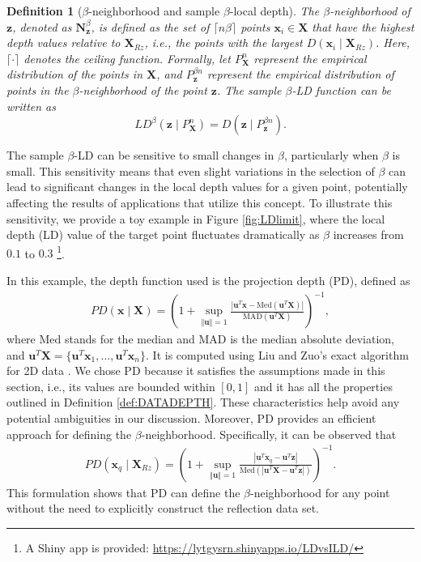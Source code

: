 \documentclass[final,3p,times]{elsarticle}
\newtheorem{thm}{\bf Definition}[section]
\newcommand{\vecx}{\mathbf{x}}
\newcommand{\vecX}{\mathbf{X}}
\newcommand{\vecN}{\mathbf{N}}
\newcommand{\vecz}{\mathbf{z}}
\begin{document}
\begin{thm}[$\beta$-neighborhood and sample $\beta$-local depth] \label{def:betanbr}
The $\beta$-neighborhood of $\vecz$, denoted as $\vecN^\beta_\vecz$, is defined as the set of $\lceil n\beta \rceil$ points $\vecx_i \in \mathbf{X}$ that have the highest depth values relative to $\mathbf{X}_{Rz}$, i.e., the points with the largest $D\left(\vecx_i \mid \mathbf{X}_{Rz}\right)$. Here, $\lceil \cdot \rceil$ denotes the ceiling function.
Formally, let $P^{n}_\vecX$ represent the empirical distribution of the points in $\mathbf{X}$, and $P^{\beta n}_{\vecz}$ represent the empirical distribution of points in the $\beta$-neighborhood of the point $\vecz$. The sample $\beta$-LD function can be written as 
\begin{equation}
  LD^\beta(\vecz \mid P^n_\vecX) =D(\vecz \mid P^{\beta n}_{\vecz}).
\end{equation}

\end{thm}
The sample $\beta$-LD can be sensitive to small changes in $\beta$, particularly when $\beta$ is small. This sensitivity means that even slight variations in the selection of $\beta$ can lead to significant changes in the local depth values for a given point, potentially affecting the results of applications that utilize this concept. To illustrate this sensitivity, we provide a toy example in Figure \ref{fig:LDlimit}, where the local depth (LD) value of the target point fluctuates dramatically as $\beta$ increases from $0.1$ to $0.3$ \footnote{A Shiny app is provided: \url{https://lytgysrn.shinyapps.io/LDvsILD/}}.


In this example, the depth function used is the projection depth (PD), defined as
\begin{eqnarray}\label{eq:pd}
PD(\vecx\mid\mathbf{X})=\left(1+\sup_{\Vert \boldsymbol{u} \Vert=1}\frac{|\boldsymbol{u}^T \vecx-\text{Med}(\boldsymbol{u}^T\mathbf{X})|}{\text{MAD}(\boldsymbol{u}^T\mathbf{X})}\right)^{-1},
\end{eqnarray}
where $\mathrm{Med}$ stands for the median and $\mathrm{MAD}$ is the median absolute deviation, and 
$\boldsymbol{u}^{T}\mathbf{X}=\{\boldsymbol{u}^{T}\vecx_{1},\ldots,\boldsymbol{u}^{T}\vecx_{n}\}.$
It is computed using Liu and Zuo's exact algorithm for 2D data \cite{liu2013exactly,liu2014computing}. We chose PD because it satisfies the assumptions made in this section, i.e., its values are bounded within $[0, 1]$ and it has all the properties outlined in Definition \ref{def:DATADEPTH}. These characteristics help avoid any potential ambiguities in our discussion.
Moreover, PD provides an efficient approach for defining the $\beta$-neighborhood. Specifically, it can be observed that
 \begin{eqnarray}
     PD(\vecx_q\mid \vecX_{Rz})=\left(1+\sup_{\Vert \boldsymbol{u} \Vert=1}\frac{|\boldsymbol{u}^T \vecx_q-\boldsymbol{u}^T \vecz|}{\text{Med}(|\boldsymbol{u}^T\mathbf{X}-\boldsymbol{u}^T \vecz|)}\right)^{-1}.
 \end{eqnarray}
This formulation shows that PD can define the $\beta$-neighborhood for any point without the need to explicitly construct the reflection data set.
\end{document}
